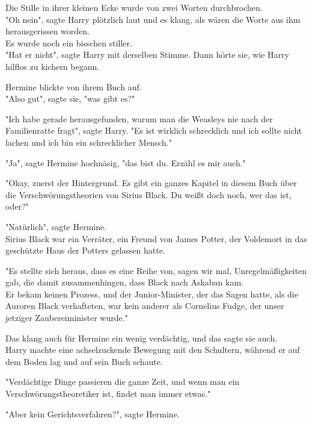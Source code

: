 {Die Stille in ihrer kleinen Ecke wurde von zwei Worten durchbrochen.\\ "Oh nein", sagte Harry plötzlich laut und es klang, als wären die Worte aus ihm herausgerissen worden.\\ Es wurde noch ein bisschen stiller.\\ "Hat er nicht", sagte Harry mit derselben Stimme. Dann hörte sie, wie Harry hilflos zu kichern begann.

Hermine blickte von ihrem Buch auf.\\ "Also gut", sagte sie, "was gibt es?"

"Ich habe gerade herausgefunden, warum man die Weasleys nie nach der Familienratte fragt", sagte Harry. "Es ist wirklich schrecklich und ich sollte nicht lachen und ich bin ein schrecklicher Mensch."

"Ja", sagte Hermine hochnäsig, "das bist du. Erzähl es mir auch."

"Okay, zuerst der Hintergrund. Es gibt ein ganzes Kapitel in diesem Buch über die Verschwörungstheorien von Sirius Black. Du weißt doch noch, wer das ist, oder?"

"Natürlich", sagte Hermine.\\ Sirius Black war ein Verräter, ein Freund von James Potter, der Voldemort in das geschützte Haus der Potters gelassen hatte.

"Es stellte sich heraus, dass es eine Reihe von, sagen wir mal, Unregelmäßigkeiten gab, die damit zusammenhingen, dass Black nach Askaban kam.\\ Er bekam keinen Prozess, und der Junior-Minister, der das Sagen hatte, als die Auroren Black verhafteten, war kein anderer als Cornelius Fudge, der unser jetziger Zaubereiminister wurde."

Das klang auch für Hermine ein wenig verdächtig, und das sagte sie auch.\\ Harry machte eine achselzuckende Bewegung mit den Schultern, während er auf dem Boden lag und auf sein Buch schaute.

"Verdächtige Dinge passieren die ganze Zeit, und wenn man ein Verschwörungstheoretiker ist, findet man immer etwas."

"Aber kein Gerichtsverfahren?", sagte Hermine.

}
